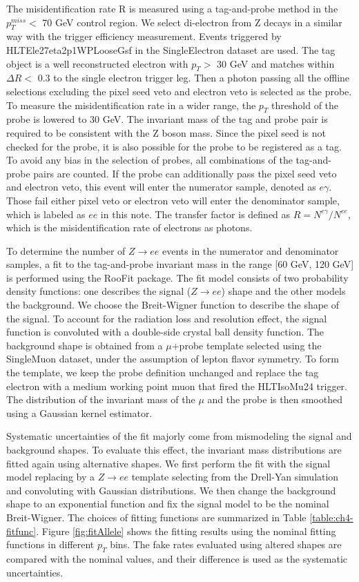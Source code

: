 \documentclass[thesis.tex]{subfiles}
\renewcommand\_{\textunderscore\allowbreak}
\begin{document}
The misidentification rate R is measured using a tag-and-probe method in the $p_T^{miss} < $ 70 GeV control region. We select di-electron from Z decays in a similar way with the trigger efficiency measurement. Events triggered by HLT\_Ele27\_eta2p1\_WPLoose\_Gsf in the SingleElectron dataset are used. The tag object is a well reconstructed electron with $p_T >$ 30 GeV and matches within $\Delta R <$ 0.3 to the single electron trigger leg. Then a photon passing all the offline selections excluding the pixel seed veto and electron veto is selected as the probe. To measure the misidentification rate in a wider range, the $p_T$ threshold of the probe is lowered to 30 GeV. The invariant mass of the tag and probe pair is required to be consistent with the Z boson mass. Since the pixel seed is not checked for the probe, it is also possible for the probe to be registered as a tag. To avoid any bias in the selection of probes, all combinations of the tag-and-probe pairs are counted. If the probe can additionally pass the pixel seed veto and electron veto, this event will enter the numerator sample, denoted as $e\gamma$. Those fail either pixel veto or electron veto will enter the denominator sample, which is labeled as $ee$ in this note. The transfer factor is defined as $R = N^{e\gamma}/N^{ee}$, which is the misidentification rate of electrons as photons.

To determine the number of $Z\rightarrow ee$ events in the numerator and denominator samples, a fit to the tag-and-probe invariant mass in the range [60 GeV, 120 GeV] is performed using the RooFit package. The fit model consists of two probability density functions: one describes the signal ($Z\rightarrow ee$) shape and the other models the background. We choose the Breit-Wigner function to describe the shape of the signal. To account for the radiation loss and resolution effect, the signal function is convoluted with a double-side crystal ball density function. The background shape is obtained from a $\mu$+probe template selected using the SingleMuon dataset, under the assumption of lepton flavor symmetry.  To form the template, we keep the probe definition unchanged and replace the tag electron with a medium working point muon that fired the HLT\_IsoMu24 trigger. The distribution of the invariant mass of the $\mu$ and the probe is then smoothed using a Gaussian kernel estimator. 

Systematic uncertainties of the fit majorly come from mismodeling the signal and background shapes. To evaluate this effect, the invariant mass distributions are fitted again using alternative shapes. We first perform the fit with the signal model replacing by a $Z\rightarrow ee$ template selecting from the Drell-Yan simulation and convoluting with Gaussian distributions. We then change the background shape to an exponential function and fix the signal model to be the nominal Breit-Wigner. The choices of fitting functions are summarized in Table \ref{table:ch4-fitfunc}. Figure \ref{fig:fitAllele} shows the fitting results using the nominal fitting functions in different $p_T$ bins. The fake rates evaluated using altered shapes are compared with the nominal values, and their difference is used as the systematic uncertainties.
\end{document}
